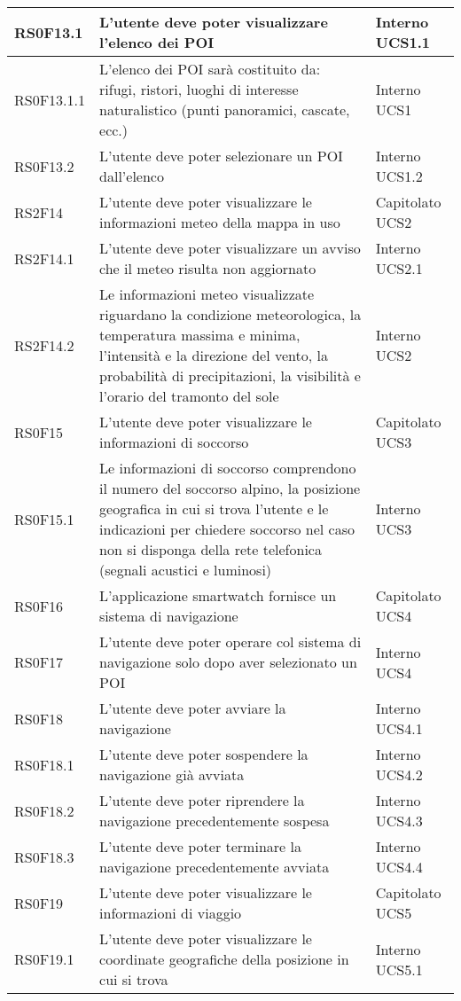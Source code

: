 \begin{center}
\begin{longtable}{|l|p{7cm}|p{1.7cm}|}
RS0F13.1	& L'utente deve poter visualizzare l'elenco dei POI & Interno UCS1.1 \\\hline
RS0F13.1.1	& L'elenco dei POI sarà costituito da: rifugi, ristori, luoghi di interesse naturalistico (punti panoramici, cascate, ecc.) & Interno UCS1 \\\hline
RS0F13.2	& L'utente deve poter selezionare un POI dall'elenco & Interno UCS1.2 \\\hline
RS2F14		& L'utente deve poter visualizzare le informazioni meteo della mappa in uso & Capitolato UCS2 \\\hline
RS2F14.1	& L'utente deve poter visualizzare un avviso che il meteo risulta non aggiornato & Interno UCS2.1 \\\hline
RS2F14.2	& Le informazioni meteo visualizzate riguardano la condizione meteorologica, la temperatura massima e minima, l'intensità e la direzione del vento, la probabilità di precipitazioni, la visibilità e l'orario del tramonto del sole & Interno UCS2 \\\hline
RS0F15		& L'utente deve poter visualizzare le informazioni di soccorso & Capitolato UCS3 \\\hline
RS0F15.1	& Le informazioni di soccorso comprendono il numero del soccorso alpino, la posizione geografica in cui si trova l'utente e le indicazioni per chiedere soccorso nel caso non si disponga della rete telefonica (segnali acustici e luminosi) & Interno UCS3 \\\hline
RS0F16		& L'applicazione smartwatch fornisce un sistema di navigazione & Capitolato UCS4 \\\hline
RS0F17		& L'utente deve poter operare col sistema di navigazione solo dopo aver selezionato un POI & Interno UCS4 \\\hline
RS0F18		& L'utente deve poter avviare la navigazione & Interno UCS4.1 \\\hline
RS0F18.1	& L'utente deve poter sospendere la navigazione già avviata & Interno UCS4.2 \\\hline
RS0F18.2	& L'utente deve poter riprendere la navigazione precedentemente sospesa & Interno UCS4.3 \\\hline
RS0F18.3	& L'utente deve poter terminare la navigazione precedentemente avviata & Interno UCS4.4 \\\hline
RS0F19		& L'utente deve poter visualizzare le informazioni di viaggio & Capitolato UCS5 \\\hline
RS0F19.1	& L'utente deve poter visualizzare le coordinate geografiche della posizione in cui si trova & Interno UCS5.1 \\\hline

\end{longtable}
\end{center}
